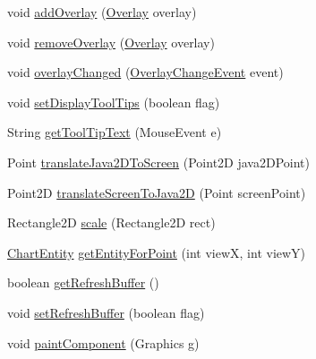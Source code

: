 \begin{DoxyCompactItemize}
\item 
void \mbox{\hyperlink{classorg_1_1jfree_1_1chart_1_1_chart_panel_aca2b01b8b0e52da6587509a006baf882}{add\+Overlay}} (\mbox{\hyperlink{interfaceorg_1_1jfree_1_1chart_1_1panel_1_1_overlay}{Overlay}} overlay)
\item 
void \mbox{\hyperlink{classorg_1_1jfree_1_1chart_1_1_chart_panel_aaaafd8f993cc3387efee45b893b88086}{remove\+Overlay}} (\mbox{\hyperlink{interfaceorg_1_1jfree_1_1chart_1_1panel_1_1_overlay}{Overlay}} overlay)
\item 
void \mbox{\hyperlink{classorg_1_1jfree_1_1chart_1_1_chart_panel_a62bd903d184caa407418637fd8fdfc66}{overlay\+Changed}} (\mbox{\hyperlink{classorg_1_1jfree_1_1chart_1_1event_1_1_overlay_change_event}{Overlay\+Change\+Event}} event)
\item 
void \mbox{\hyperlink{classorg_1_1jfree_1_1chart_1_1_chart_panel_a99c62a1da7a8cfa274ee0b109a47e100}{set\+Display\+Tool\+Tips}} (boolean flag)
\item 
String \mbox{\hyperlink{classorg_1_1jfree_1_1chart_1_1_chart_panel_a84571cbbc4516cb61c48b653146f51d4}{get\+Tool\+Tip\+Text}} (Mouse\+Event e)
\item 
Point \mbox{\hyperlink{classorg_1_1jfree_1_1chart_1_1_chart_panel_ad8101f9b70e800c7f93fadc36fc95993}{translate\+Java2\+D\+To\+Screen}} (Point2D java2\+D\+Point)
\item 
Point2D \mbox{\hyperlink{classorg_1_1jfree_1_1chart_1_1_chart_panel_a0855297bc0fdf566ae4e3298ec1a102d}{translate\+Screen\+To\+Java2D}} (Point screen\+Point)
\item 
Rectangle2D \mbox{\hyperlink{classorg_1_1jfree_1_1chart_1_1_chart_panel_aafacfd58546e57c29101722f096085f8}{scale}} (Rectangle2D rect)
\item 
\mbox{\hyperlink{classorg_1_1jfree_1_1chart_1_1entity_1_1_chart_entity}{Chart\+Entity}} \mbox{\hyperlink{classorg_1_1jfree_1_1chart_1_1_chart_panel_a886392b2f12e5da06f91680f7d521aa7}{get\+Entity\+For\+Point}} (int viewX, int viewY)
\item 
boolean \mbox{\hyperlink{classorg_1_1jfree_1_1chart_1_1_chart_panel_a562363abd0360bedcc23d8bd7d071be7}{get\+Refresh\+Buffer}} ()
\item 
void \mbox{\hyperlink{classorg_1_1jfree_1_1chart_1_1_chart_panel_ae9474a574a8bce645f533f4a80ae203a}{set\+Refresh\+Buffer}} (boolean flag)
\item 
void \mbox{\hyperlink{classorg_1_1jfree_1_1chart_1_1_chart_panel_ab8868dda0efc34971fa140b31569bcbc}{paint\+Component}} (Graphics g)
\item 

\end{DoxyCompactItemize}
